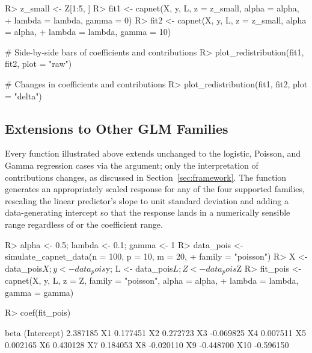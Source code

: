 \documentclass[article,shortnames,nofooter]{jss}
\begin{document}
\begin{Code}
    R> z_small <- Z[1:5, ]
    R> fit1 <- capnet(X, y, L, z = z_small, alpha = alpha, 
    +    lambda = lambda, gamma = 0)
    R> fit2 <- capnet(X, y, L, z = z_small, alpha = alpha, 
    +    lambda = lambda, gamma = 10)

    # Side-by-side bars of coefficients and contributions
    R> plot_redistribution(fit1, fit2, plot = "raw")

    # Changes in coefficients and contributions
    R> plot_redistribution(fit1, fit2, plot = "delta")
\end{Code}

\subsection{Extensions to Other GLM Families}\label{sec:software-families}

Every function illustrated above extends unchanged to the logistic, Poisson, and Gamma regression cases via the  argument; only the interpretation of contributions changes, as discussed in Section~\ref{sec:framework}. The  function generates an appropriately scaled response for any of the four supported families, rescaling the linear predictor's slope to unit standard deviation and adding a data-generating intercept so that the response lands in a numerically sensible range regardless of  or the coefficient range.

\begin{Code}
    R> alpha <- 0.5; lambda <- 0.1; gamma <- 1
    R> data_pois <- simulate_capnet_data(n = 100, p = 10, m = 20,
    +     family = "poisson")
    R> X <- data_pois$X; y <- data_pois$y; L <- data_pois$L; Z <- data_pois$Z
    R> fit_pois <- capnet(X, y, L, z = Z, family = "poisson", alpha = alpha,
    +    lambda = lambda, gamma = gamma)
\end{Code}

\begin{CodeChunk}
\begin{CodeInput}
    R> coef(fit_pois)
\end{CodeInput}
\begin{CodeOutput}
                    beta
    (Intercept)  2.387185
    X1           0.177451
    X2           0.272723
    X3          -0.069825
    X4           0.007511
    X5           0.002165
    X6           0.430128
    X7           0.184053
    X8          -0.020110
    X9          -0.448700
    X10         -0.596150
\end{CodeOutput}
\end{CodeChunk}
\end{document}
